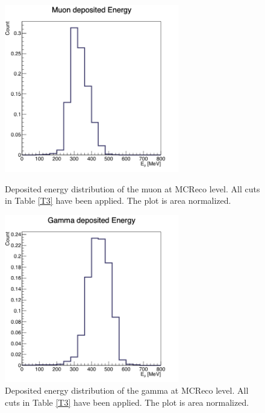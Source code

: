 \documentclass[a4paper, 10pt]{article}
\begin{document}
\begin{figure}[h!]
\centering
\begin{minipage}{0.45\textwidth}
\centering
\includegraphics[width=3in]{pMuGamma/MuonMCEn.png}
\caption{Deposited energy distribution of the muon at MCReco level. All cuts in Table \ref{T3} have been applied. The plot is area normalized. }
\label{F1}
\end{minipage}\hfill
\begin{minipage}{0.45\textwidth}
\centering
\includegraphics[width=3in]{pMuGamma/GammaMCEn.png}
\caption{Deposited energy distribution of the gamma at MCReco level. All cuts in Table \ref{T3} have been applied. The plot is area normalized.}
\label{F2}
\end{minipage}
\end{figure}
\end{document}
